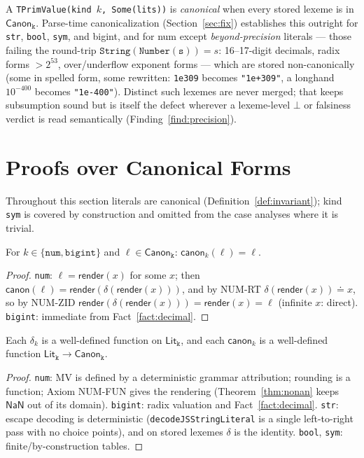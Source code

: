 \documentclass[11pt]{article}
\newcommand{\Lit}[1]{\mathsf{Lit}_{\texttt{#1}}}
\newcommand{\Canon}[1]{\mathsf{Canon}_{\texttt{#1}}}
\newcommand{\canon}{\mathsf{canon}}
\newcommand{\render}{\mathsf{render}}
\newcommand{\zeq}{\doteq}   %
\begin{document}
\begin{definition}
\label{def:invariant}
A \texttt{TPrimValue(kind $k$, Some(lits))} is \emph{canonical} when
every stored lexeme is in $\Canon{k}$. Parse-time canonicalization
(Section~\ref{sec:fix}) establishes this outright for \texttt{str},
\texttt{bool}, \texttt{sym}, and bigint, and for num except
\emph{beyond-precision} literals --- those failing the round-trip
$\mathtt{String(Number(s))} = s$: 16--17-digit decimals, radix forms
$> 2^{53}$, over/underflow exponent forms --- which are stored
non-canonically (some in spelled form, some rewritten: \texttt{1e309}
becomes \texttt{"1e+309"}, a longhand $10^{-400}$ becomes
\texttt{"1e-400"}). Distinct such lexemes are never merged; that keeps
subsumption sound but is itself the defect wherever a lexeme-level
$\bot$ or falsiness verdict is read semantically
(Finding~\ref{find:precision}).
\end{definition}

\section{Proofs over Canonical Forms}
\label{sec:proofs}

Throughout this section literals are canonical
(Definition~\ref{def:invariant}); kind \texttt{sym} is covered by
construction and omitted from the case analyses where it is trivial.

\begin{lemma}[Idempotence]
\label{lem:idem}
For $k \in \{\texttt{num}, \texttt{bigint}\}$ and $\ell \in \Canon{k}$:
$\canon_k(\ell) = \ell$.
\end{lemma}
\begin{proof}
\texttt{num}: $\ell = \render(x)$ for some $x$; then
$\canon(\ell) = \render(\delta(\render(x)))$, and by NUM-RT
$\delta(\render(x)) \zeq x$, so by NUM-ZID
$\render(\delta(\render(x))) = \render(x) = \ell$ (infinite $x$: direct).
\texttt{bigint}: immediate from Fact~\ref{fact:decimal}.
\end{proof}

\begin{theorem}
\label{thm:fun}
Each $\delta_k$ is a well-defined function on $\Lit{k}$, and each
$\canon_k$ is a well-defined function $\Lit{k} \to \Canon{k}$.
\end{theorem}
\begin{proof}
\texttt{num}: MV is defined by a deterministic grammar attribution;
rounding is a function; Axiom NUM-FUN gives the rendering
(Theorem~\ref{thm:nonan} keeps $\mathsf{NaN}$ out of its domain).
\texttt{bigint}: radix valuation and Fact~\ref{fact:decimal}.
\texttt{str}: escape decoding is deterministic
(\texttt{decodeJSStringLiteral} is a single left-to-right pass with no
choice points), and on stored lexemes $\delta$ is the identity.
\texttt{bool}, \texttt{sym}: finite/by-construction tables.
\end{proof}
\end{document}
